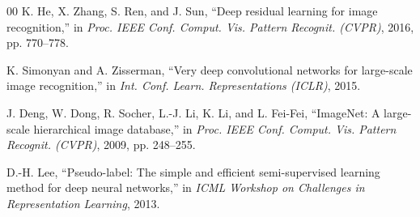 \documentclass[conference]{IEEEtran}
\begin{document}
\begin{thebibliography}{00}
K. He, X. Zhang, S. Ren, and J. Sun, ``Deep residual learning for image
recognition,'' in \emph{Proc. IEEE Conf. Comput. Vis. Pattern
Recognit. (CVPR)}, 2016, pp. 770--778.

K. Simonyan and A. Zisserman, ``Very deep convolutional networks for
large-scale image recognition,'' in \emph{Int. Conf. Learn.
Representations (ICLR)}, 2015.

J. Deng, W. Dong, R. Socher, L.-J. Li, K. Li, and L. Fei-Fei,
``ImageNet: A large-scale hierarchical image database,'' in \emph{Proc.
IEEE Conf. Comput. Vis. Pattern Recognit. (CVPR)}, 2009, pp. 248--255.

D.-H. Lee, ``Pseudo-label: The simple and efficient semi-supervised
learning method for deep neural networks,'' in \emph{ICML Workshop on
Challenges in Representation Learning}, 2013.

\end{thebibliography}
\end{document}
